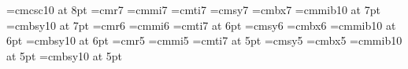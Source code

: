 \font\eightcsc=cmcsc10 at 8pt
%
\font\sevenrm=cmr7
\font\seveni=cmmi7
\font\sevenit=cmti7
\font\sevensy=cmsy7
\font\sevenbf=cmbx7
\font\sevenbi=cmmib10 at 7pt
\font\sevenbsy=cmbsy10 at 7pt
%
\font\sixrm=cmr6
\font\sixi=cmmi6
\font\sixit=cmti7 at 6pt
\font\sixsy=cmsy6
\font\sixbf=cmbx6
\font\sixbi=cmmib10 at 6pt
\font\sixbsy=cmbsy10 at 6pt
%
\font\fiverm=cmr5
\font\fivei=cmmi5
\font\fiveit=cmti7 at 5pt
\font\fivesy=cmsy5
\font\fivebf=cmbx5
\font\fivebi=cmmib10 at 5pt
\font\fivebsy=cmbsy10 at 5pt
\def\fourteenpoint{\def\rm{\fam0\fourteenrm}%
    \textfont0=\fourteenrm \scriptfont0=\twelverm \scriptscriptfont0=\tenrm
    \textfont1=\fourteeni  \scriptfont1=\twelvei  \scriptscriptfont1=\teni
    \textfont2=\fourteensy \scriptfont2=\twelvesy \scriptscriptfont2=\tensy
    \textfont\itfam=\fourteenit  \def\it{\fam\itfam\fourteenit}%
    \textfont\slfam=\fourteensl  \def\sl{\fam\slfam\fourteensl}%
    \textfont\bffam=\fourteenbf  \scriptfont\bffam=\twelvebf
      \scriptscriptfont\bffam=\tenbf   \def\bf{\fam\bffam\fourteenbf}%
    \normalbaselineskip=20pt
    \setbox\strutbox=\hbox{\vrule height15pt depth5pt width0pt}%
    \let\sc=\twelverm  
    \normalbaselines\rm}
\def\twelvepoint{\def\rm{\fam0\twelverm}%
    \textfont0=\twelverm \scriptfont0=\tenrm\scriptscriptfont0=\sevenrm
    \textfont1=\twelvei  \scriptfont1=\teni  \scriptscriptfont1=\seveni
    \textfont2=\twelvesy \scriptfont2=\tensy \scriptscriptfont2=\sevensy
    \textfont\itfam=\twelveit  \def\it{\fam\itfam\twelveit}%
    \textfont\slfam=\twelvesl  \def\sl{\fam\slfam\twelvesl}%
    \textfont\bffam=\twelvebf  \scriptfont\bffam=\tenbf
      \scriptscriptfont\bffam=\tenbf   \def\bf{\fam\bffam\twelvebf}%
    \normalbaselineskip=16pt
    \setbox\strutbox=\hbox{\vrule height12pt depth4pt width0pt}%
    \let\sc=\tenrm  \let\csc=\twelvecsc  \let\er=\tenrm
    \normalbaselines\rm}
\def\elevenpoint{\def\rm{\fam0\elevenrm}%
    \textfont0=\elevenrm \scriptfont0=\eightrm \scriptscriptfont0=\sixrm
    \textfont1=\eleveni  \scriptfont1=\eighti  \scriptscriptfont1=\sixi
    \textfont2=\elevensy \scriptfont2=\eightsy \scriptscriptfont2=\sixsy
    \textfont\itfam=\elevenit  \def\it{\fam\itfam\elevenit}%
    \textfont\slfam=\elevensl  \def\sl{\fam\slfam\elevensl}%
    \textfont\bffam=\elevenbf  \scriptfont\bffam=\eightbf
      \scriptscriptfont\bffam=\sixbf   \def\bf{\fam\bffam\elevenbf}%
    \normalbaselineskip=13pt
    \setbox\strutbox=\hbox{\vrule height8.5pt depth3.5pt width0pt}%
    \let\sc=\eightrm  \let\csc=\elevencsc  \let\er=\eightrm
    \normalbaselines\rm}
